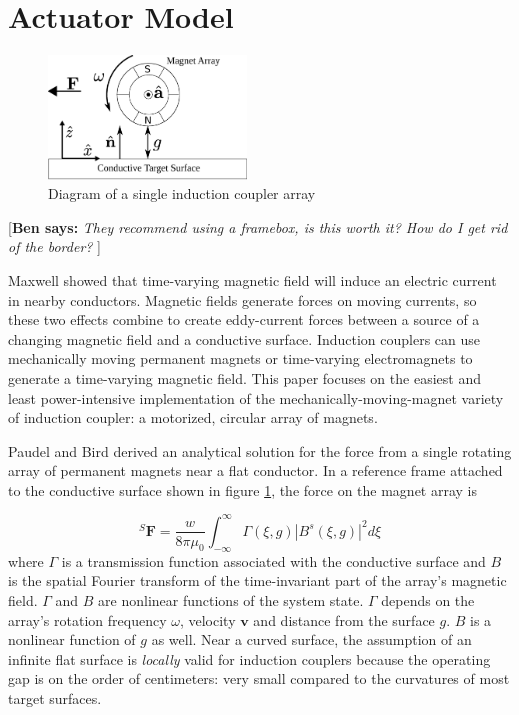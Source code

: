 \documentclass[letterpaper, 10 pt, conference]{ieeeconf}  %
\newcommand{\ben}[1]{{\color{red}\small\par {[{\bf Ben says:} {\em #1}} ] \\    }}
\begin{document}
%
\section{Actuator Model}
\label{sec:model}
 \begin{figure}[thpb]
      \centering
      \includegraphics[width = 0.47\textwidth]{figures/spin_mag_diagram.eps}
      \caption{Diagram of a single induction coupler array}
      \label{fig:single_array}
   \end{figure}
\ben{They recommend using a framebox, is this worth it? How do I get rid of the border?}   
\par Maxwell showed that time-varying magnetic field will induce an electric current in nearby conductors. Magnetic fields generate forces on moving currents, so these two effects combine to create eddy-current forces between a source of a changing magnetic field and a conductive surface. Induction couplers can use mechanically moving permanent magnets or time-varying electromagnets to generate a time-varying magnetic field. This paper focuses on the easiest and least power-intensive implementation of the mechanically-moving-magnet variety of induction coupler: a motorized, circular array of magnets. 
%
\par Paudel and Bird derived an analytical solution for the force from a single rotating array of permanent magnets near a flat conductor. \cite{Paudel2013} In a reference frame attached to the conductive surface shown in figure \ref{fig:single_array}, the force on the magnet array is

\begin{equation}
\label{eq:Paudel55}
{}^S\textbf{F} = \frac{w}{8\pi\mu_0} \int^{\infty}_{-\infty}\Gamma(\xi,g)|B^s(\xi,g)|^2 d\xi
\end{equation}
where $\Gamma$ is a transmission function associated with the conductive surface and $B$ is the spatial Fourier transform of the time-invariant part of the array's magnetic field.
$\Gamma$ and $B$ are nonlinear functions of the system state. $\Gamma$ depends on the array's rotation frequency $\omega$, velocity $\textbf{v}$ and distance from the surface $g$. $B$ is a nonlinear function of $g$ as well. Near a curved surface, the assumption of an infinite flat surface is \textit{locally} valid for induction couplers because the operating gap is on the order of centimeters: very small compared to the curvatures of most target surfaces. 
 
\end{document}
